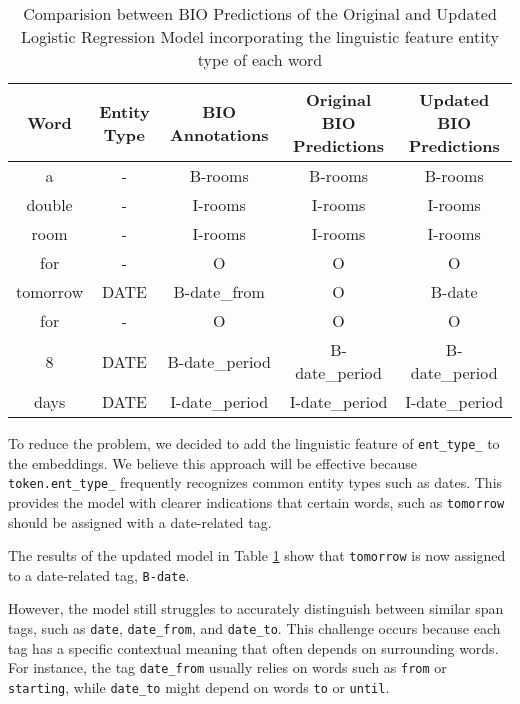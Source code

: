 \documentclass[11pt,a4paper]{article}
\begin{document}
\begin{table}[H]
    \centering
    \begin{tabular}{|c|c|c|c|c|}
        \hline
        \textbf{Word} & \makecell{\textbf{Entity} \\ \textbf{Type}} & \textbf{BIO Annotations} & \makecell{\textbf{Original} \\ \textbf{BIO Predictions}} & \makecell{\textbf{Updated} \\ \textbf{BIO Predictions}}\\
        \hline
        a & - & B-rooms & B-rooms & B-rooms \\

        double & - & I-rooms & I-rooms & I-rooms \\

        room & - & I-rooms & I-rooms & I-rooms \\

        for & - & O & O & O \\

        tomorrow & DATE & B-date\_from & O & B-date \\

        for & - & O & O & O\\

        8 & DATE & B-date\_period & B-date\_period & B-date\_period\\

        days & DATE & I-date\_period & I-date\_period & I-date\_period\\
        \hline
    \end{tabular}
    \caption{Comparision between BIO Predictions of the Original and Updated Logistic Regression Model incorporating the linguistic feature entity type of each word}
    \label{tab_entity}
\end{table}

To reduce the problem, we decided to add the linguistic feature of \texttt{ent\_type\_} to the embeddings. We believe this approach will be effective because \texttt{token.ent\_type\_} frequently recognizes common entity types such as dates. This provides the model with clearer indications that certain words, such as \texttt{tomorrow} should be assigned with a date-related tag.

The results of the updated model in Table \ref{tab_entity} show that \texttt{tomorrow} is now assigned to a date-related tag, \texttt{B-date}.

However, the model still struggles to accurately distinguish between similar span tags, such as \texttt{date}, \texttt{date\_from}, and \texttt{date\_to}. This challenge occurs because each tag has a specific contextual meaning that often depends on surrounding words. For instance, the tag \texttt{date\_from} usually relies on words such as \texttt{from} or \texttt{starting}, while \texttt{date\_to} might depend on words \texttt{to} or \texttt{until}.
\end{document}
